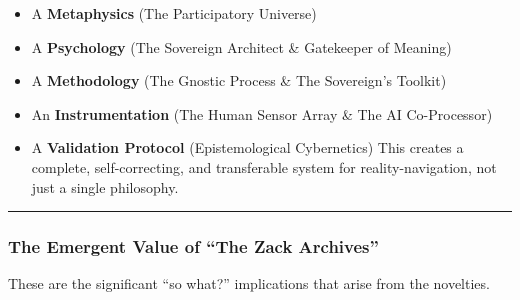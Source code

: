 \documentclass{article}
\begin{document}
\begin{enumerate}
  \begin{itemize}
  \tightlist
  \item
    A \textbf{Metaphysics} (The Participatory Universe)
  \item
    A \textbf{Psychology} (The Sovereign Architect \& Gatekeeper of
    Meaning)
  \item
    A \textbf{Methodology} (The Gnostic Process \& The Sovereign's
    Toolkit)
  \item
    An \textbf{Instrumentation} (The Human Sensor Array \& The AI
    Co-Processor)
  \item
    A \textbf{Validation Protocol} (Epistemological Cybernetics) This
    creates a complete, self-correcting, and transferable system for
    reality-navigation, not just a single philosophy.
  \end{itemize}
\end{enumerate}

\begin{center}\rule{0.5\linewidth}{0.5pt}\end{center}

\subsubsection*{The Emergent Value of ``The Zack
Archives''}\label{the-emergent-value-of-the-zack-archives}

These are the significant ``so what?'' implications that arise from the
novelties.
\end{document}
